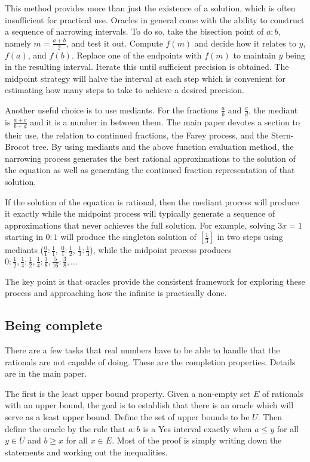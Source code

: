 \documentclass[12pt]{article}
\theoremstyle{remark}
\begin{document}
This method provides more than just the existence of a solution, which is often insufficient for practical use. Oracles in general come with the ability to construct a sequence of narrowing intervals. To do so, take the bisection point of $a:b$, namely $m =\frac{a+b}{2}$, and test it out. Compute $f(m)$ and decide how it relates to $y$, $f(a)$, and $f(b)$. Replace one of the endpoints with $f(m)$ to maintain $y$ being in the resulting interval. Iterate this until sufficient precision is obtained.  The midpoint strategy will halve the interval at each step which is convenient for estimating how many steps to take to achieve a desired precision. 

Another useful choice is to use mediants. For the fractions $\frac{a}{b}$ and $\frac{c}{d}$, the mediant is $\frac{a+c}{b+d}$ and it is a number in between them. The main paper devotes a section to their use, the relation to continued fractions, the Farey process, and the Stern-Brocot tree. By using mediants and the above function evaluation method, the narrowing process generates the best rational approximations to the solution of the equation as well as generating the continued fraction representation of that solution. 

If the solution of the equation is rational, then the mediant process will produce it exactly while the midpoint process will typically generate a sequence of approximations that never achieves the full solution. For example, solving $3x = 1$ starting in $0:1$ will produce the singleton solution of $[\frac{1}{3}]$ in two steps using mediants ($\frac{0}{1}:\frac{1}{1}$, $\frac{0}{1}:\frac{1}{2}$, $\frac{1}{3}:\frac{1}{3}$), while the midpoint process produces $0:\frac{1}{2}, \frac{1}{4}: \frac{1}{2}, \frac{1}{4}: \frac{3}{8}, \frac{5}{16}: \frac{3}{8}, \ldots$

The key point is that oracles provide the consistent framework for exploring these process and approaching how the infinite is practically done. 

\subsection{Being complete}

There are a few tasks that real numbers have to be able to handle that the rationals are not capable of doing. These are the completion properties. Details are in the main paper.

The first is the least upper bound property. Given a non-empty set $E$ of rationals with an upper bound, the goal is  to establish that there is an oracle which will serve as a least upper bound. Define the set of upper bounds to be $U$. Then define the oracle by the rule that $a:b$ is a Yes interval exactly when $a\leq y$ for all $y \in U$ and $b\geq x$ for all $x\in E$. Most of the proof is simply writing down the statements and working out the inequalities. 
\end{document}
